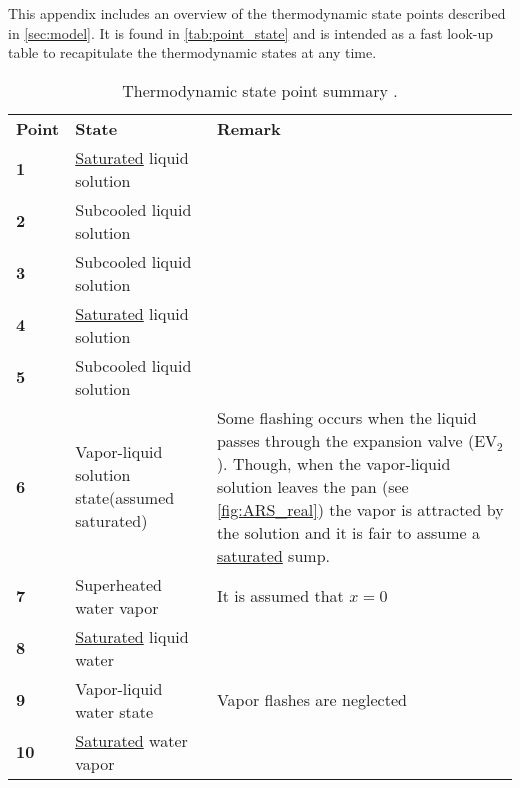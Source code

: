 This appendix includes an overview of the thermodynamic state points described in \autoref{sec:model}. It is found in \autoref{tab:point_state} and is intended as a fast look-up table to recapitulate the thermodynamic states at any time.
\begin{table}[H]
\begin{tabularx}{\textwidth}{  p{1cm} p{4.5cm}  X   }
\rowcolor{HeaderBlue} 
\textbf{Point} & \textbf{State} & \textbf{Remark} \\
\textbf{1}&\underline{Saturated} liquid solution &  \\  
\rowcolor{textBlue} 
 \textbf{2}& Subcooled liquid solution &  \\  
\textbf{3}& Subcooled liquid solution &  \\  
\rowcolor{textBlue} 
 \textbf{4}& \underline{Saturated} liquid solution & \\  
\textbf{5}  & Subcooled liquid solution & \\
 \rowcolor{textBlue} 
 \textbf{6} & Vapor-liquid solution state\newline (assumed saturated) & Some flashing occurs when the liquid passes through the expansion valve (EV$_2$). Though, when the vapor-liquid solution leaves the pan (see \autoref{fig:ARS_real}) the vapor is attracted by the solution and it is fair to assume a  \underline{saturated} sump. \\ 
  \textbf{7} & Superheated water vapor & It is assumed that $x=0$\\ 
   \rowcolor{textBlue} 
 \textbf{8} & \underline{Saturated} liquid water & \\ 
  \textbf{9} & Vapor-liquid water state & Vapor flashes are neglected \\ 
     \rowcolor{textBlue} 
 \textbf{10} & \underline{Saturated} water vapor & \\
\end{tabularx}
	\caption{Thermodynamic state point summary \citep{bib:chillers}.}
\label{tab:point_state}
\end{table}
